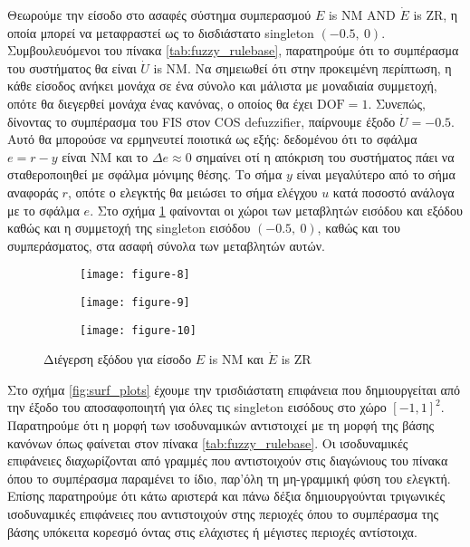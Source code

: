 \documentclass[11pt,a4paper,titlepage, oneside]{article}
\newlength\figureheight
\newlength\figurewidth
\begin{document}
	Θεωρούμε την είσοδο στο ασαφές σύστημα συμπερασμού $E$ is NM AND $\dot{E}$ is ZR, η οποία μπορεί να μεταφραστεί ως το δισδιάστατο singleton $(-0.5,\ 0)$. Συμβουλευόμενοι του πίνακα \ref{tab:fuzzy_rulebase}, παρατηρούμε ότι το συμπέρασμα του συστήματος θα είναι $\dot{U}$ is NM. Να σημειωθεί ότι στην προκειμένη περίπτωση, η κάθε είσοδος ανήκει μονάχα σε ένα σύνολο και μάλιστα με μοναδιαία συμμετοχή, οπότε θα διεγερθεί μονάχα ένας κανόνας, ο οποίος θα έχει $\text{DOF} = 1$. Συνεπώς, δίνοντας το συμπέρασμα του FIS στον COS defuzzifier, παίρνουμε έξοδο $\dot{U} = -0.5$. Αυτό θα μπορούσε να ερμηνευτεί ποιοτικά ως εξής: δεδομένου ότι το σφάλμα $e = r - y$ είναι NM και το $\Delta e \approx 0$ σημαίνει οτί η απόκριση του συστήματος πάει να σταθεροποιηθεί με σφάλμα μόνιμης θέσης. Το σήμα $y$ είναι μεγαλύτερο από το σήμα αναφοράς $r$, οπότε ο ελεγκτής θα μειώσει το σήμα ελέγχου $u$  κατά ποσοστό ανάλογα με το σφάλμα $e$. Στο σχήμα \ref{fig:rule_firings} φαίνονται οι χώροι των μεταβλητών εισόδου και εξόδου καθώς και η συμμετοχή της singleton εισόδου $(-0.5,\ 0)$, καθώς και του συμπεράσματος, στα ασαφή σύνολα των μεταβλητών αυτών.	\\
	
	\begin{figure}[]
	 	\setlength\figureheight{2.3cm}
	 	\setlength{}
		\centering
		\begin{subfigure}[t]{0.32\textwidth}
			\vspace{0pt}
			\texttt{[image: figure-8]}
		\end{subfigure}
		\begin{subfigure}[t]{0.32\textwidth}
			\vspace{0pt}
			\texttt{[image: figure-9]}
		\end{subfigure}
		\begin{subfigure}[t]{0.32\textwidth}
			\vspace{0pt}
			\texttt{[image: figure-10]}
		\end{subfigure}
		\caption{Διέγερση εξόδου για είσοδο $E$ is NM και $\dot{E}$ is ZR}
		\label{fig:rule_firings}
	\end{figure}

	Στο σχήμα \ref{fig:surf_plots} έχουμε την τρισδιάστατη επιφάνεια που δημιουργείται από την έξοδο του αποσαφοποιητή για όλες τις singleton εισόδους στο χώρο $[-1, 1]^2$. Παρατηρούμε ότι η μορφή των ισοδυναμικών αντιστοιχεί με τη μορφή της βάσης κανόνων όπως φαίνεται στον πίνακα \ref{tab:fuzzy_rulebase}. Οι ισοδυναμικές επιφάνειες διαχωρίζονται από γραμμές που αντιστοιχούν στις διαγώνιους του πίνακα όπου το συμπέρασμα παραμένει το ίδιο, παρ'όλη τη μη-γραμμική φύση του ελεγκτή. Επίσης παρατηρούμε ότι κάτω αριστερά και πάνω δέξια δημιουργούνται τριγωνικές ισοδυναμικές επιφάνειες που αντιστοιχούν στης περιοχές όπου το συμπέρασμα της βάσης υπόκειτα κορεσμό όντας στις ελάχιστες ή μέγιστες περιοχές αντίστοιχα. 
\end{document}
